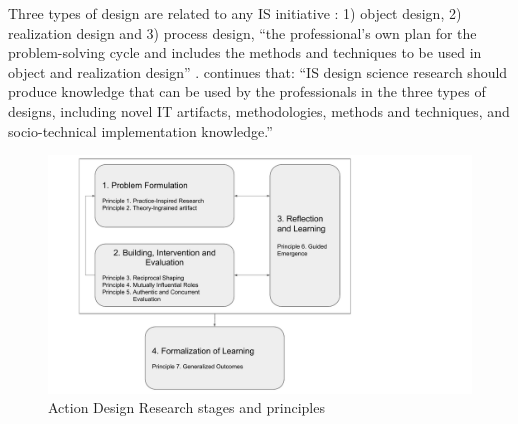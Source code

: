Three types of design are related to any IS initiative \citep{Carlsson2010DesignApproach,Aken2004ManagementRules}:
1) object design, 2) realization design and 3) process design, ``the professional’s own plan for the problem-solving cycle and includes the methods and techniques to be used in object and realization design'' \citep{Carlsson2010DesignApproach}. \cite{Carlsson2010DesignApproach} continues that: ``IS design science research should produce knowledge that can be used by the professionals in the three types of designs, including novel IT artifacts, methodologies, methods and techniques, and socio-technical implementation knowledge.''


\begin{figure}[htb]
\centering
\includegraphics[width=12cm]{diagram/Action_Design_Research_Reproduced.pdf}
\caption{Action Design Research stages and principles \citep[reproduced following][]{Sein2011ActionResearch}}
\label{fig:adr-stages-and-principles}
\end{figure}


